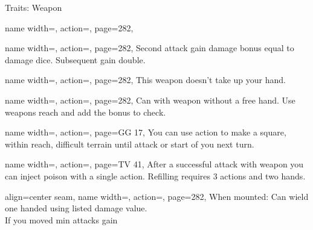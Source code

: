 \begin{PageBack}
\begin{Tables}{\backTableHeight}
\begin{Table}{Traits: Weapon}
\begin{entry}{}{%
                name width=\conditionLength,%
                action=\Finesse,
                page=282,
            }
            \end{entry}
            \begin{entry}{}{%
                name width=\conditionLength,%
                action=\Forceful,
                page=282,
            }
                Second attack gain \Cirm damage bonus equal to damage dice. Subsequent gain double.
            \end{entry}
            \begin{entry}{}{%
                name width=\conditionLength,%
                action=\FreeHand,
                page=282,
            }
                This weapon doesn't take up your hand.\hfill {}
            \end{entry}
            \breakLine
            \begin{entry}{}{%
                name width=\conditionLength,%
                action=\Grapple,
                page=282,
            }
                Can  with weapon without a free hand. Use weapons reach and add the \Item bonus
                to check. \hfill
            \end{entry}
            \breakLine
            \begin{entry}{}{%
                name width=\conditionLength,%
                action=\Hampering,
                page=GG 17,
            }
                You can use  action to make a square, within reach, difficult terrain until
                attack or start of you next turn.
            \end{entry}
            \breakLine
            \begin{entry}{}{%
                name width=\conditionLength,%
                action=\Injection,
                page=TV 41,
            }
                After a successful attack with weapon you can inject poison with a single 
                action. \hfill Refilling requires 3  actions and two hands.
            \end{entry}
            \breakLine
            \begin{entry}{}{%
                align=center seam,
                name width=\conditionLength,%
                action=\Jousting,
                page=282,
            }
                When mounted: Can wield one handed using listed damage value. \hfill {}\\If you moved min  \Feet attacks gain

\end{entry}
\end{Table}
\end{Tables}
\end{PageBack}
